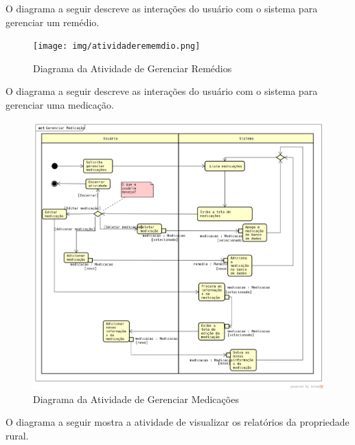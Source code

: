 \documentclass[12pt]{article}
\begin{document}
	O diagrama a seguir descreve as interações do usuário com o sistema para gerenciar um remédio.

	\begin{figure}[!h]
		\begin{center}
			\caption{Diagrama da Atividade de Gerenciar Remédios}
			\texttt{[image: img/atividaderememdio.png]}

		\end{center}
	\end{figure}

	\newpage

	O diagrama a seguir descreve as interações do usuário com o sistema para gerenciar uma medicação.

	\begin{figure}[!h]
		\begin{center}
			\caption{Diagrama da Atividade de Gerenciar Medicações}
			\includegraphics[width=6in]{img/atividademedicacao.png}

		\end{center}
	\end{figure}

	\newpage

	O diagrama a seguir mostra a atividade de visualizar os relatórios da propriedade rural.
\end{document}
